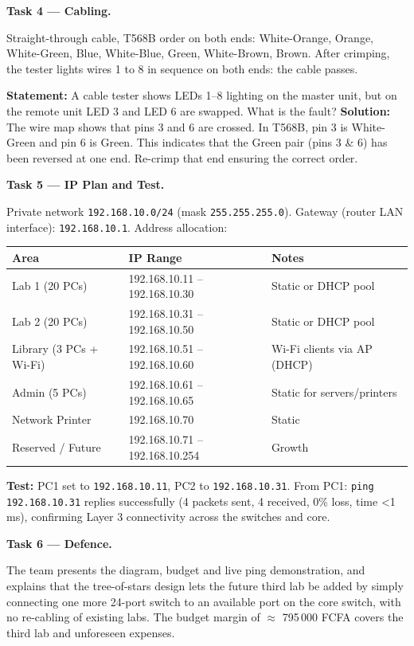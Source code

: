 \documentclass[11pt]{article}
\begin{document}
\textbf{Task 4 — Cabling.}\par
Straight-through cable, T568B order on both ends: White-Orange, Orange, White-Green, Blue, White-Blue, Green, White-Brown, Brown. After crimping, the tester lights wires 1 to 8 in sequence on both ends: the cable passes.

\begin{exoresolu}
\textbf{Statement:} A cable tester shows LEDs 1–8 lighting on the master unit, but on the remote unit LED 3 and LED 6 are swapped. What is the fault?
\tcblower
\textbf{Solution:} The wire map shows that pins 3 and 6 are crossed. In T568B, pin 3 is White-Green and pin 6 is Green. This indicates that the Green pair (pins 3 \& 6) has been reversed at one end. Re-crimp that end ensuring the correct order.
\end{exoresolu}

\textbf{Task 5 — IP Plan and Test.}\par
Private network \texttt{192.168.10.0/24} (mask \texttt{255.255.255.0}). Gateway (router LAN interface): \texttt{192.168.10.1}. Address allocation:

\begin{center}
\begin{tabular}{|l|l|l|}\hline
\rowcolor{popblueL} \textbf{Area} & \textbf{IP Range} & \textbf{Notes} \\ \hline
Lab 1 (20 PCs) & 192.168.10.11 – 192.168.10.30 & Static or DHCP pool \\ \hline
Lab 2 (20 PCs) & 192.168.10.31 – 192.168.10.50 & Static or DHCP pool \\ \hline
Library (3 PCs + Wi-Fi) & 192.168.10.51 – 192.168.10.60 & Wi-Fi clients via AP (DHCP) \\ \hline
Admin (5 PCs) & 192.168.10.61 – 192.168.10.65 & Static for servers/printers \\ \hline
Network Printer & 192.168.10.70 & Static \\ \hline
Reserved / Future & 192.168.10.71 – 192.168.10.254 & Growth \\ \hline
\end{tabular}
\end{center}

\textbf{Test:} PC1 set to \texttt{192.168.10.11}, PC2 to \texttt{192.168.10.31}. From PC1: \texttt{ping 192.168.10.31} replies successfully (4 packets sent, 4 received, 0\% loss, time <1 ms), confirming Layer 3 connectivity across the switches and core.

\textbf{Task 6 — Defence.}\par
The team presents the diagram, budget and live ping demonstration, and explains that the tree-of-stars design lets the future third lab be added by simply connecting one more 24-port switch to an available port on the core switch, with no re-cabling of existing labs. The budget margin of $\approx$ 795\,000 FCFA covers the third lab and unforeseen expenses.
\end{document}

